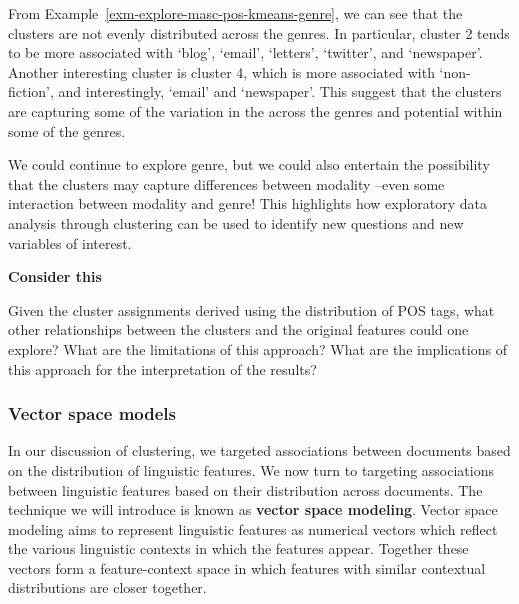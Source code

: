 \documentclass[
  letterpaper,
  krantz1]{latex/krantz-mod}
\theoremstyle{definition}
\theoremstyle{definition}
\theoremstyle{remark}
\begin{document}
From Example~\ref{exm-explore-masc-pos-kmeans-genre}, we can see that
the clusters are not evenly distributed across the genres. In
particular, cluster 2 tends to be more associated with `blog', `email',
`letters', `twitter', and `newspaper'. Another interesting cluster is
cluster 4, which is more associated with `non-fiction', and
interestingly, `email' and `newspaper'. This suggest that the clusters
are capturing some of the variation in the across the genres and
potential within some of the genres.

We could continue to explore genre, but we could also entertain the
possibility that the clusters may capture differences between modality
--even some interaction between modality and genre! This highlights how
exploratory data analysis through clustering can be used to identify new
questions and new variables of interest.

\begin{tcolorbox}[enhanced jigsaw, leftrule=.75mm, colframe=quarto-callout-color-frame, left=2mm, colback=white, toprule=.15mm, breakable, arc=.35mm, opacityback=0, bottomrule=.15mm, rightrule=.15mm]

\textbf{ Consider this}

Given the cluster assignments derived using the distribution of POS
tags, what other relationships between the clusters and the original
features could one explore? What are the limitations of this approach?
What are the implications of this approach for the interpretation of the
results?

\end{tcolorbox}

\subsubsection{Vector space
models}\label{sec-explore-vector-space-models}

In our discussion of clustering, we targeted associations between
documents based on the distribution of linguistic features. We now turn
to targeting associations between linguistic features based on their
distribution across documents. The technique we will introduce is known
as \textbf{vector space modeling}. Vector space modeling aims to
represent linguistic features as numerical vectors which reflect the
various linguistic contexts in which the features appear. Together these
vectors form a feature-context space in which features with similar
contextual distributions are closer together.
\end{document}
